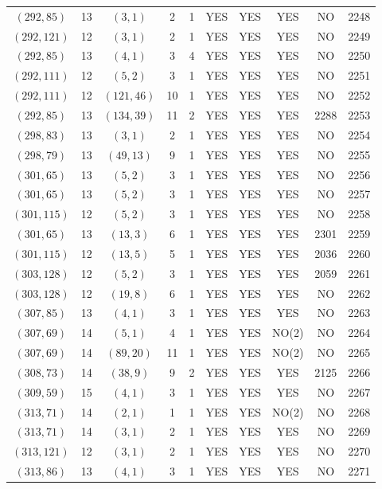 \begin{longtable}{|c|c|c|c|c|c|c|c|c|c|}
$(292, 85)$ & 13 & $(3, 1)$ & 2 & 1 & YES & YES & YES & NO & 2248\\
$(292, 121)$ & 12 & $(3, 1)$ & 2 & 1 & YES & YES & YES & NO & 2249\\
$(292, 85)$ & 13 & $(4, 1)$ & 3 & 4 & YES & YES & YES & NO & 2250\\
$(292, 111)$ & 12 & $(5, 2)$ & 3 & 1 & YES & YES & YES & NO & 2251\\
$(292, 111)$ & 12 & $(121, 46)$ & 10 & 1 & YES & YES & YES & NO & 2252\\
$(292, 85)$ & 13 & $(134, 39)$ & 11 & 2 & YES & YES & YES & 2288 & 2253\\
$(298, 83)$ & 13 & $(3, 1)$ & 2 & 1 & YES & YES & YES & NO & 2254\\
$(298, 79)$ & 13 & $(49, 13)$ & 9 & 1 & YES & YES & YES & NO & 2255\\
$(301, 65)$ & 13 & $(5, 2)$ & 3 & 1 & YES & YES & YES & NO & 2256\\
$(301, 65)$ & 13 & $(5, 2)$ & 3 & 1 & YES & YES & YES & NO & 2257\\
$(301, 115)$ & 12 & $(5, 2)$ & 3 & 1 & YES & YES & YES & NO & 2258\\
$(301, 65)$ & 13 & $(13, 3)$ & 6 & 1 & YES & YES & YES & 2301 & 2259\\
$(301, 115)$ & 12 & $(13, 5)$ & 5 & 1 & YES & YES & YES & 2036 & 2260\\
$(303, 128)$ & 12 & $(5, 2)$ & 3 & 1 & YES & YES & YES & 2059 & 2261\\
$(303, 128)$ & 12 & $(19, 8)$ & 6 & 1 & YES & YES & YES & NO & 2262\\
$(307, 85)$ & 13 & $(4, 1)$ & 3 & 1 & YES & YES & YES & NO & 2263\\
$(307, 69)$ & 14 & $(5, 1)$ & 4 & 1 & YES & YES & NO(2) & NO & 2264\\
$(307, 69)$ & 14 & $(89, 20)$ & 11 & 1 & YES & YES & NO(2) & NO & 2265\\
$(308, 73)$ & 14 & $(38, 9)$ & 9 & 2 & YES & YES & YES & 2125 & 2266\\
$(309, 59)$ & 15 & $(4, 1)$ & 3 & 1 & YES & YES & YES & NO & 2267\\
$(313, 71)$ & 14 & $(2, 1)$ & 1 & 1 & YES & YES & NO(2) & NO & 2268\\
$(313, 71)$ & 14 & $(3, 1)$ & 2 & 1 & YES & YES & YES & NO & 2269\\
$(313, 121)$ & 12 & $(3, 1)$ & 2 & 1 & YES & YES & YES & NO & 2270\\
$(313, 86)$ & 13 & $(4, 1)$ & 3 & 1 & YES & YES & YES & NO & 2271\\

\end{longtable}

